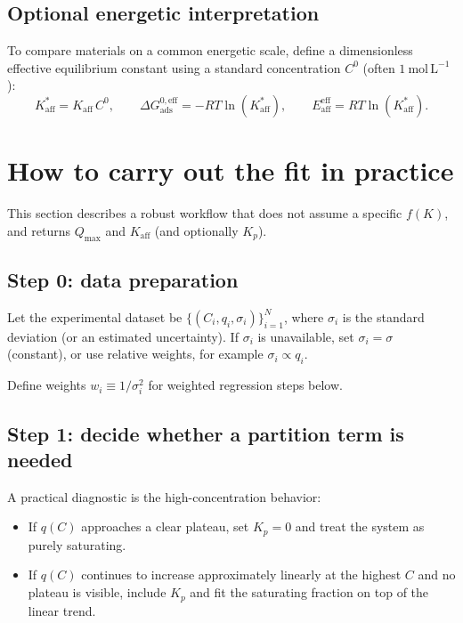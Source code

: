 \documentclass[12pt]{article}
\begin{document}
	\subsection{Optional energetic interpretation}
	
	To compare materials on a common energetic scale, define a dimensionless effective equilibrium constant using a standard concentration $C^0$ (often $1~\mathrm{mol\,L^{-1}}$):
	\begin{equation}
		K_{\mathrm{aff}}^\ast = K_{\mathrm{aff}}\,C^0,
		\qquad
		\Delta G_{\mathrm{ads}}^{0,\mathrm{eff}} = -RT\ln(K_{\mathrm{aff}}^\ast),
		\qquad
		E_{\mathrm{aff}}^{\mathrm{eff}} = RT\ln(K_{\mathrm{aff}}^\ast).
	\end{equation}
	
	\section{How to carry out the fit in practice}
	
	This section describes a robust workflow that does not assume a specific $f(K)$, and returns $Q_{\max}$ and $K_{\mathrm{aff}}$ (and optionally $K_p$).
	
	\subsection{Step 0: data preparation}
	
	Let the experimental dataset be $\{(C_i,q_i,\sigma_i)\}_{i=1}^N$, where $\sigma_i$ is the standard deviation (or an estimated uncertainty). If $\sigma_i$ is unavailable, set $\sigma_i=\sigma$ (constant), or use relative weights, for example $\sigma_i \propto q_i$.
	
	Define weights $w_i \equiv 1/\sigma_i^2$ for weighted regression steps below.
	
	\subsection{Step 1: decide whether a partition term is needed}
	
	A practical diagnostic is the high-concentration behavior:
	
	\begin{itemize}
		\item If $q(C)$ approaches a clear plateau, set $K_p=0$ and treat the system as purely saturating.
		\item If $q(C)$ continues to increase approximately linearly at the highest $C$ and no plateau is visible, include $K_p$ and fit the saturating fraction on top of the linear trend.
	\end{itemize}
	
\end{document}
